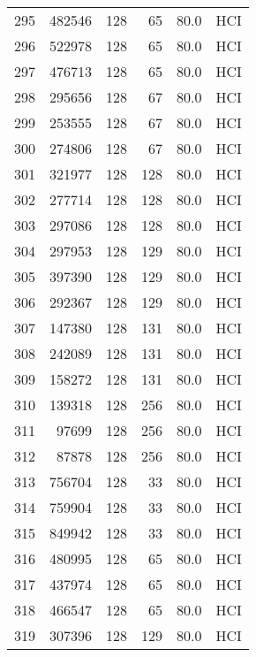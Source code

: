 \begin{longtable}{lrrrrl}
295 &    482546 &        128 &        65 &           80.0 &  HCI \\
296 &    522978 &        128 &        65 &           80.0 &  HCI \\
297 &    476713 &        128 &        65 &           80.0 &  HCI \\
298 &    295656 &        128 &        67 &           80.0 &  HCI \\
299 &    253555 &        128 &        67 &           80.0 &  HCI \\
300 &    274806 &        128 &        67 &           80.0 &  HCI \\
301 &    321977 &        128 &       128 &           80.0 &  HCI \\
302 &    277714 &        128 &       128 &           80.0 &  HCI \\
303 &    297086 &        128 &       128 &           80.0 &  HCI \\
304 &    297953 &        128 &       129 &           80.0 &  HCI \\
305 &    397390 &        128 &       129 &           80.0 &  HCI \\
306 &    292367 &        128 &       129 &           80.0 &  HCI \\
307 &    147380 &        128 &       131 &           80.0 &  HCI \\
308 &    242089 &        128 &       131 &           80.0 &  HCI \\
309 &    158272 &        128 &       131 &           80.0 &  HCI \\
310 &    139318 &        128 &       256 &           80.0 &  HCI \\
311 &     97699 &        128 &       256 &           80.0 &  HCI \\
312 &     87878 &        128 &       256 &           80.0 &  HCI \\
313 &    756704 &        128 &        33 &           80.0 &  HCI \\
314 &    759904 &        128 &        33 &           80.0 &  HCI \\
315 &    849942 &        128 &        33 &           80.0 &  HCI \\
316 &    480995 &        128 &        65 &           80.0 &  HCI \\
317 &    437974 &        128 &        65 &           80.0 &  HCI \\
318 &    466547 &        128 &        65 &           80.0 &  HCI \\
319 &    307396 &        128 &       129 &           80.0 &  HCI \\

\end{longtable}
